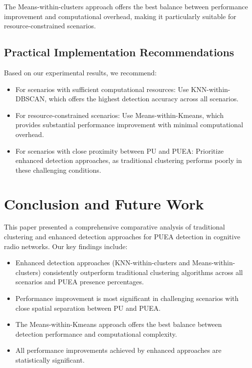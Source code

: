 \documentclass[conference]{IEEEtran}
\begin{document}
The Means-within-clusters approach offers the best balance between performance improvement and computational overhead, making it particularly suitable for resource-constrained scenarios.

\subsection{Practical Implementation Recommendations}

Based on our experimental results, we recommend:

\begin{itemize}
    \item For scenarios with sufficient computational resources: Use KNN-within-DBSCAN, which offers the highest detection accuracy across all scenarios.
    \item For resource-constrained scenarios: Use Means-within-Kmeans, which provides substantial performance improvement with minimal computational overhead.
    \item For scenarios with close proximity between PU and PUEA: Prioritize enhanced detection approaches, as traditional clustering performs poorly in these challenging conditions.
\end{itemize}

\section{Conclusion and Future Work}
\label{sec:conclusion}

This paper presented a comprehensive comparative analysis of traditional clustering and enhanced detection approaches for PUEA detection in cognitive radio networks. Our key findings include:

\begin{itemize}
    \item Enhanced detection approaches (KNN-within-clusters and Means-within-clusters) consistently outperform traditional clustering algorithms across all scenarios and PUEA presence percentages.
    \item Performance improvement is most significant in challenging scenarios with close spatial separation between PU and PUEA.
    \item The Means-within-Kmeans approach offers the best balance between detection performance and computational complexity.
    \item All performance improvements achieved by enhanced approaches are statistically significant.
\end{itemize}
\end{document}
